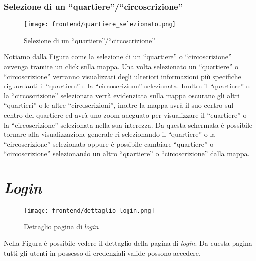     \subsubsection{Selezione di un ``quartiere''/``circoscrizione''}
        \begin{figure}[H]
            \centering
            \texttt{[image: frontend/quartiere\_selezionato.png]}
            \caption{Selezione di un ``quartiere''/``circoscrizione''}
            \label{fig:frontend-quartiere}
        \end{figure}
        Notiamo dalla Figura  come la selezione di un ``quartiere'' o ``circoscrizione'' avvenga tramite un click sulla mappa. Una volta selezionato un ``quartiere'' o ``circoscrizione'' verranno visualizzati degli ulteriori informazioni più specifiche riguardanti il ``quartiere'' o la ``circoscrizione'' selezionata. Inoltre il ``quartiere'' o la ``circoscrizione'' selezionata verrà evidenziata sulla mappa oscurano gli altri ``quartieri'' o le altre ``circoscrizioni'', inoltre la mappa avrà il suo centro sul centro del quartiere ed avrà uno zoom adeguato per visualizzare il ``quartiere'' o la ``circoscrizione'' selezionata nella sua interezza. Da questa schermata è possibile tornare alla visualizzazione generale ri-selezionando il ``quartiere'' o la ``circoscrizione'' selezionata oppure è possibile cambiare ``quartiere'' o ``circoscrizione'' selezionando un altro ``quartiere'' o ``circoscrizione'' dalla mappa.
\section{\textit{Login}}
    \begin{figure}[H]
        \centering
        \texttt{[image: frontend/dettaglio\_login.png]}
        \caption{Dettaglio pagina di \textit{login}}
        \label{fig:frontend-login}
    \end{figure}
    Nella Figura  è possibile vedere il dettaglio della pagina di \textit{login}. Da questa pagina tutti gli utenti in possesso di credenziali valide possono accedere. \newpage
